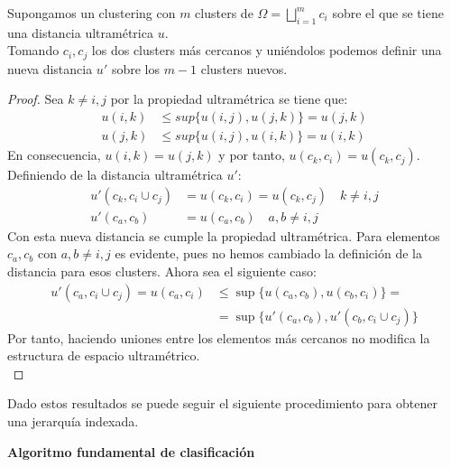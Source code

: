 \begin{teorema}
Supongamos un clustering con $m$ clusters de $\Omega =\bigsqcup_{i=1}^m c_i$ sobre el que se tiene una distancia ultramétrica $u$.\\
Tomando $c_i,c_j$ los dos clusters más cercanos y uniéndolos podemos definir una nueva distancia $u'$ sobre los $m-1$ clusters nuevos. 
\begin{proof}
Sea $k\neq i,j$ por la propiedad ultramétrica se tiene que: 
\begin{equation}
\begin{split}
u(i,k)&\leq sup\lbrace u(i,j),u(j,k) \rbrace = u(j,k) \\
u(j,k)&\leq sup\lbrace u(i,j),u(i,k) \rbrace = u(i,k)
\end{split}
\end{equation}
En consecuencia, $u(i,k)=u(j,k)$ y por tanto, $u(c_k,c_i)=u(c_k,c_j)$.\\
Definiendo de la distancia ultramétrica $u'$:
\begin{equation}
\begin{split}
u'(c_k,c_i\cup c_j) &= u(c_k,c_i) = u(c_k,c_j) \quad k\neq i,j\\
u'(c_a,c_b) &= u(c_a,c_b) \quad a,b\neq i,j
\end{split}
\end{equation}
Con esta nueva distancia se cumple la propiedad ultramétrica. Para elementos $c_a,c_b$ con $a,b \neq i,j $ es evidente, pues no hemos cambiado la definición de la distancia para esos clusters. Ahora sea el siguiente caso:
\begin{equation}
\begin{split}
u'(c_a,c_i\cup c_j)=u(c_a,c_i)&\leq \sup\lbrace u(c_a,c_b), u(c_b,c_i)\rbrace =\\
&= \sup\lbrace u'(c_a,c_b), u'(c_b,c_i\cup c_j)\rbrace
\end{split}
\end{equation}
Por tanto, haciendo uniones entre los elementos más cercanos no modifica la estructura de espacio ultramétrico. \\
\qedhere
\end{proof}
\end{teorema}

\noindent Dado estos resultados se puede seguir el siguiente procedimiento para obtener una jerarquía indexada.   
\newpage

\noindent \textbf{Algoritmo fundamental de clasificación}

